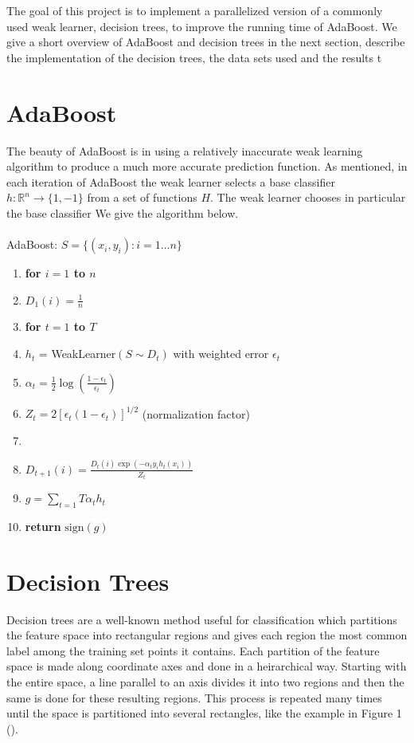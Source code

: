 \documentclass[12pt]{article}
\begin{document}
The goal of this project is to implement a parallelized version of a commonly used weak learner, decision trees, to improve the running time of AdaBoost. We give a short overview of AdaBoost and decision trees in the next section, describe the implementation of the decision trees, the data sets used and the results t 

\section{AdaBoost}
The beauty of AdaBoost is in using a relatively inaccurate weak learning algorithm to produce a much more accurate prediction function. As mentioned, in each iteration of AdaBoost the weak learner selects a base classifier $h: \mathbb{R}^n\rightarrow\{1,-1\}$ from a set of functions $H$. The weak learner chooses in particular the base classifier  We give the algorithm below.\\
\\
{\sc AdaBoost}: $S = \{(x_i,y_i):i = 1\ldots n\}$
\begin{enumerate}
\itemsep1pt \parskip0pt 
\item {\bf for $i=1$ to $n$}
\item \quad $D_1(i) = \frac{1}{n}$
\item {\bf for $t=1$ to $T$}
\item \quad $h_t$ = {\sc WeakLearner}$(S\sim D_t)$ with weighted error $\epsilon_t$
\item \quad $\alpha_t = \frac{1}{2}\log(\frac{1-\epsilon_t}{\epsilon_t})$
\item \quad $Z_t = 2[\epsilon_t(1-\epsilon_t)]^{1/2}$ (normalization factor)
\item {}
\item \quad \quad $D_{t+1}(i) = \frac{D_t(i)\exp(-\alpha_t y_i h_t(x_i))}{Z_t}$
\item $g = \sum_{t=1}{T} \alpha_t h_t$
\item {\bf return} $\mbox{sign}(g)$
\end{enumerate}



\section{Decision Trees}
Decision trees are a well-known method useful for classification which partitions the feature space into rectangular regions and gives each region the most common label among the training set points it contains. Each partition of the feature space is made along coordinate axes and done in a heirarchical way. Starting with the entire space, a line parallel to an axis divides it into two regions and then the same is done for these resulting regions. This process is repeated many times until the space is partitioned into several rectangles, like the example in Figure 1 (\cite{HTF}).
\end{document}
